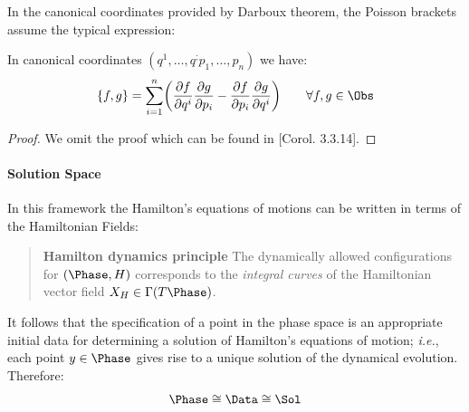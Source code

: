 \documentclass[Main]{subfiles}
\begin{document}
	
	\vspace{2mm}
	In the canonical coordinates provided  by  Darboux theorem, the  Poisson brackets assume the typical expression:
	\begin{proposition}
	
	In canonical coordinates  $(q^1, \ldots, q^; p_1, \ldots, p_n)$ we have:
	\begin{equation}\label{Eq:SymplecticCoordinateRepresentation}
		\{f,g\} = \sum_{i=1}^n \biggr(\frac{\partial f}{\partial q^i} \frac{\partial g}{\partial p_i}  - \frac{\partial f}{\partial p_i} \frac{\partial g}{\partial q^i} \biggr) \qquad \forall f,g \in \Obs
	\end{equation}
	\end{proposition}
	\begin{proof}
			We omit the proof which can be found in \cite{Abraham1978}[Corol. 3.3.14].
	\end{proof}

	\paragraph{Solution Space}
	In this framework the Hamilton's equations of motions can be written in terms of the Hamiltonian Fields:
				\begin{quote}
				\textbf{Hamilton dynamics principle}
				The dynamically allowed configurations for $(\Phase,H)$ corresponds to the \emph{ integral curves}\cite{Abraham1978} of the Hamiltonian vector field $X_H \in \Gamma(T\Phase)$.
			\end{quote}
		It follows that the specification of a point in the phase space is an appropriate initial data for determining a solution of Hamilton's equations of motion; \textit{i.e.}, each point $y\in \Phase$  gives rise to a unique solution of the dynamical evolution.\\
		Therefore:
		\begin{equation}\label{Eq:PhaseDataSol}
			\Phase \cong \Data \cong \Sol
		\end{equation}
	
\end{document}
